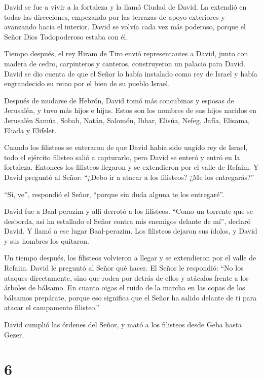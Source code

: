  David se fue a vivir a la fortaleza y la llamó Ciudad de
David. La extendió en todas las direcciones, empezando por las terrazas
de apoyo exteriores y avanzando hacia el interior.  David
se volvía cada vez más poderoso, porque el Señor Dios Todopoderoso
estaba con él.

 Tiempo después, el rey Hiram de Tiro envió representantes
a David, junto con madera de cedro, carpinteros y canteros, construyeron
un palacio para David.  David se dio cuenta de que el Señor
lo había instalado como rey de Israel y había engrandecido su reino por
el bien de su pueblo Israel.

 Después de mudarse de Hebrón, David tomó más concubinas y
esposas de Jerusalén, y tuvo más hijos e hijas.  Estos son
los nombres de sus hijos nacidos en Jerusalén Samúa, Sobab, Natán,
Salomón,  Ibhar, Elisúa, Nefeg, Jafía, 
Elisama, Eliada y Elifelet.

 Cuando los filisteos se enteraron de que David había sido
ungido rey de Israel, todo el ejército filisteo salió a capturarlo, pero
David se enteró y entró en la fortaleza.  Entonces los
filisteos llegaron y se extendieron por el valle de Refaim.
 Y David preguntó al Señor: ``¿Debo ir a atacar a los
filisteos? ¿Me los entregarás?''

``Sí, ve'', respondió el Señor, ``porque sin duda alguna te los
entregaré''.

 David fue a Baal-perazim y allí derrotó a los filisteos.
``Como un torrente que se desborda, así ha estallado el Señor contra mis
enemigos delante de mí'', declaró David. Y llamó a ese lugar
Baal-perazim.  Los filisteos dejaron sus ídolos, y David y
sus hombres los quitaron.

 Un tiempo después, los filisteos volvieron a llegar y se
extendieron por el valle de Refaim.  David le preguntó al
Señor qué hacer. El Señor le respondió: ``No los ataques directamente,
sino que rodea por detrás de ellos y atácalos frente a los árboles de
bálsamo.  En cuanto oigas el ruido de la marcha en las
copas de los bálsamos prepárate, porque eso significa que el Señor ha
salido delante de ti para atacar el campamento filisteo.''

 David cumplió las órdenes del Señor, y mató a los
filisteos desde Geba hasta Gezer.

\hypertarget{section-5}{%
\section{6}\label{section-5}}

